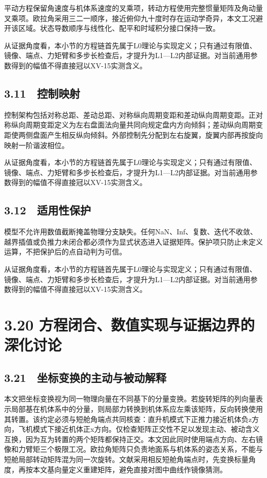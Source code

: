 \documentclass[UTF8,12pt,openany]{ctexbook}
\begin{document}
平动方程保留角速度与机体系速度的叉乘项，转动方程使用完整惯量矩阵及角动量叉乘项。欧拉角采用三二一顺序，接近俯仰九十度时存在运动学奇异，本文工况避开该区域。状态导数顺序与线性化、配平和时域积分接口保持一致。

从证据角度看，本小节的方程链首先属于L0理论与实现定义；只有通过有限值、镜像、端点、力矩臂和多步长检查后，才提升为L1—L2内部证据。对当前通用参数得到的幅值不得直接冠以XV-15实测含义。

\subsection{3.11　控制映射}

控制架构包括对称总距、差动总距、对称纵向周期变距和差动纵向周期变距。正对称纵向周期变距定义为左右盘面法向量共同向规定盘内方向倾斜；差动纵向周期变距使两侧盘面产生相反纵向倾斜。外部控制先分配到左右旋翼，旋翼内部再按旋向映射一阶谐波相位。

从证据角度看，本小节的方程链首先属于L0理论与实现定义；只有通过有限值、镜像、端点、力矩臂和多步长检查后，才提升为L1—L2内部证据。对当前通用参数得到的幅值不得直接冠以XV-15实测含义。

\subsection{3.12　适用性保护}

模型不允许用数值截断掩盖物理分支缺失。任何NaN、Inf、复数、迭代不收敛、越界插值或负推力未闭合都必须作为显式状态进入证据矩阵。保护项只防止未定义运算，不把保护后的点自动判为可信。

从证据角度看，本小节的方程链首先属于L0理论与实现定义；只有通过有限值、镜像、端点、力矩臂和多步长检查后，才提升为L1—L2内部证据。对当前通用参数得到的幅值不得直接冠以XV-15实测含义。

\section{3.20 方程闭合、数值实现与证据边界的深化讨论}

\subsection{3.21　坐标变换的主动与被动解释}

本文把坐标变换视为同一物理向量在不同基下的分量变换。若旋转矩阵的列向量表示局部基在机体系中的分量，则局部力转换到机体系应左乘该矩阵，反向转换使用其转置。该约定必须与短舱角端点共同核查：直升机模式下正推力接近机体负z方向，飞机模式下接近机体正x方向。仅检查矩阵正交性不足以发现主动、被动含义互换，因为互为转置的两个矩阵都保持正交。本文因此同时使用端点方向、左右镜像和力臂矩三个极限工况。欧拉角矩阵只负责地面系与机体系的姿态关系，不能与短舱局部转动矩阵混为同一次旋转。文献采用相反短舱角端点时，先变换标量角度，再按本文基向量定义重建矩阵，避免直接对图中曲线作镜像猜测。
\end{document}
